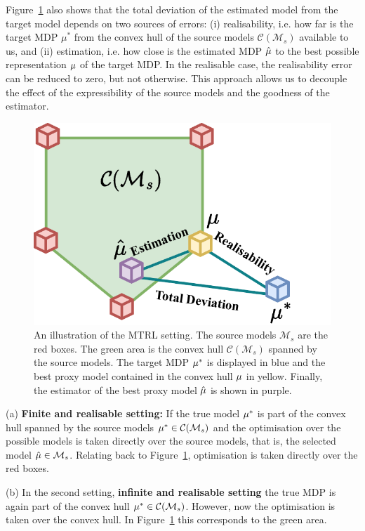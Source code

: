 Figure~\ref{fig:trl} also shows that the total deviation of the estimated model from the target model depends on two sources of errors: (i) realisability, i.e. how far is the target MDP $\mu^*$ from the convex hull of the source models $\mathcal{C}(\mathcal{M}_s)$ available to us, and (ii) estimation, i.e. how close is the estimated MDP $\hat{\mu}$ to the best possible representation $\mu$ of the target MDP. In the realisable case, the realisability error can be reduced to zero, but not otherwise. This approach allows us to decouple the effect of the expressibility of the source models and the goodness of the estimator.
\begin{figure}
    \centering
    \includegraphics[width=0.35\paperwidth]{img/TRL.pdf}
    \caption{An illustration of the MTRL setting. The source models $\mathcal{M}_s$ are the red boxes. The green area is the convex hull $\mathcal{C}(\mathcal{M}_s)$ spanned by the source models. The target MDP $\mu^{*}$ is displayed in blue and the best proxy model contained in the convex hull $\mu$ in yellow. Finally, the estimator of the best proxy model $\hat{\mu}$ is shown in purple.}
    \label{fig:trl}
\end{figure}
\iffalse
(a) \textbf{Finite and realisable setting:}  If the true model $\mu^{*}$ is part of the convex hull spanned by the source models $\mu^{*} \in \mathcal{C}(\mathcal{M}_s)$ and the optimisation over the possible models is taken directly over the source models, that is, the selected model $\hat{\mu} \in \mathcal{M}_s$. Relating back to Figure~\ref{fig:trl}, optimisation is taken directly over the red boxes. 

(b) In the second setting, \textbf{infinite and realisable setting} the true MDP is again part of the convex hull $\mu^{*} \in \mathcal{C}(\mathcal{M}_s)$. However, now the optimisation is taken over the convex hull. In Figure~\ref{fig:trl} this corresponds to the green area. 

